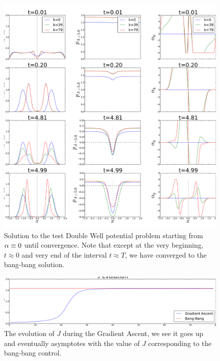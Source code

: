 \begin{figure}[htp]
\begin{center} 
  \includegraphics[width=.9\textwidth]{Figs/DoublewellFBSolver/FB_alpha_iterates_uICs_4.pdf}
  \caption[labelInTOC]{Solution to the test Double Well potential problem
  starting from $\alpha \equiv 0$ until convergence. Note that except at the very
  beginning, $t \approx 0$ and very end of the interval $t\approx T$, we have
  converged to the bang-bang solution. }
  \label{fig:FBSoln_doublewell_alpha_iterations}
\end{center}
\end{figure}

\begin{figure}[htp]
\begin{center}
  \includegraphics[width=.9\textwidth]{Figs/DoublewellFBSolver/FB_J_iterates_uICs.pdf}
  \caption[labelInTOC]{The evolution of $J$ during the Gradient Ascent, we see
  it goes up and eventually asymptotes with the value of $J$ corresponding to
  the bang-bang control. }
  \label{fig:FBSoln_doublewell_J_iterations}
\end{center}
\end{figure}
 
